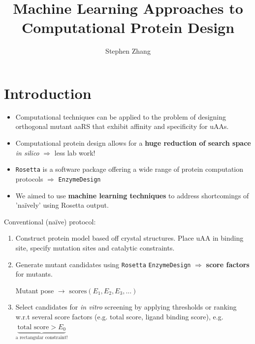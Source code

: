 \documentclass{beamer}
\title{Machine Learning Approaches to Computational Protein Design}
\author{Stephen Zhang}
\begin{document}
\begin{frame}
  \titlepage
\end{frame}

\section{Introduction}

\begin{frame}
    \begin{itemize}
        \item Computational techniques can be applied to the problem of designing orthogonal mutant aaRS that exhibit affinity and specificity for uAAs.
        \item Computational protein design allows for a \textbf{huge reduction of search space} \textit{in silico} $\Rightarrow$ less lab work!
        \item \texttt{Rosetta} is a software package offering a wide range of protein computation protocols $\Rightarrow$ \texttt{EnzymeDesign}
        \item We aimed to use \textbf{machine learning techniques} to address shortcomings of 'na\"ively' using Rosetta output.
    \end{itemize}
\end{frame}

\begin{frame}
    Conventional (na\"ive) protocol:
    \begin{enumerate}
        \item Construct protein model based off crystal structures. Place uAA in binding site, specify mutation sites and catalytic constraints.
        \item Generate mutant candidates using \texttt{Rosetta} \texttt{EnzymeDesign} $\Rightarrow$ \textbf{score factors} for mutants.
        \begin{center}Mutant pose $\to$ $\mathrm{scores}(E_1, E_2, E_3, ...)$\end{center}
        \item Select candidates for \textit{in vitro} screening by applying thresholds or ranking w.r.t several score factors (e.g. total score, ligand binding score), e.g. $\underbrace{\text{total score} > E_0}_{\text{a rectangular constraint!}}$
    \end{enumerate}
\end{frame}
\end{document}
